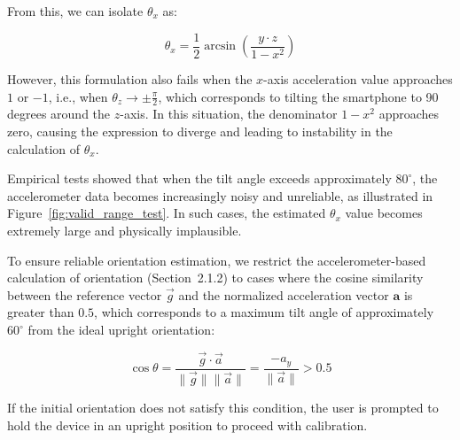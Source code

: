 \documentclass{article}
\begin{document}
From this, we can isolate $\theta_x$ as:

\[
\theta_x = \frac{1}{2} \arcsin\left(\frac{y \cdot z}{1 - x^2}\right)
\]

However, this formulation also fails when the $x$-axis acceleration value approaches $1$ or $-1$, i.e., when $\theta_z \rightarrow \pm \frac{\pi}{2}$, which corresponds to tilting the smartphone to 90 degrees around the $z$-axis. In this situation, the denominator $1 - x^2$ approaches zero, causing the expression to diverge and leading to instability in the calculation of $\theta_x$.

Empirical tests showed that when the tilt angle exceeds approximately $80^\circ$, the accelerometer data becomes increasingly noisy and unreliable, as illustrated in Figure~\ref{fig:valid_range_test}. In such cases, the estimated $\theta_x$ value becomes extremely large and physically implausible.

To ensure reliable orientation estimation, we restrict the accelerometer-based calculation of orientation (Section~2.1.2) to cases where the cosine similarity between the reference vector $\vec{g}$ and the normalized acceleration vector $\mathbf{a}$ is greater than $0.5$, which corresponds to a maximum tilt angle of approximately $60^\circ$ from the ideal upright orientation:

\[
\cos\theta = \frac{ \vec{g} \cdot \vec{a}}{\| \vec{g}\| \|\vec{a}\|} = \frac{-a_y}{\|\vec{a}\|} > 0.5
\]

If the initial orientation does not satisfy this condition, the user is prompted to hold the device in an upright position to proceed with calibration.
\end{document}
